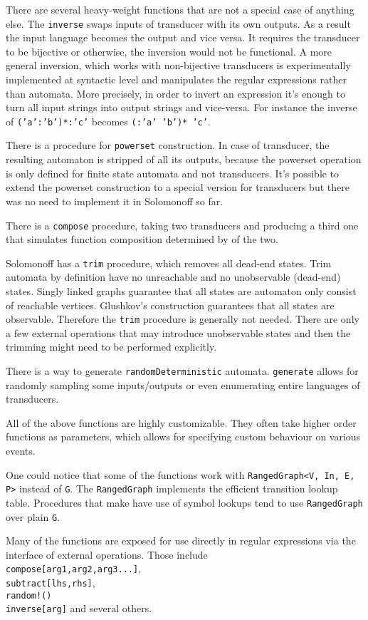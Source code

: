 \documentclass[12pt]{article}
\begin{document}
There are several heavy-weight functions that are not a special case of anything else. The
\texttt{inverse}  swaps inputs of transducer with its own outputs. As a result the input language becomes the output and vice versa. It requires the transducer to be bijective or otherwise, the inversion would not be functional. A more general inversion, which works with non-bijective transducers is experimentally implemented at syntactic level and manipulates the regular expressions rather than automata. More precisely, in order to invert an expression it's enough to turn all input strings into output strings and vice-versa. For instance the inverse of \texttt{('a':'b')*:'c'} becomes \texttt{(:'a' 'b')* 'c'}. 

There is a procedure for \texttt{powerset} construction. In case of transducer, the resulting automaton is stripped of all its outputs, because the powerset operation is only defined for finite state automata and not transducers. It's possible to extend the powerset construction to a special version for transducers but there was no need to implement it in Solomonoff so far. 

There is a \texttt{compose} procedure, taking two transducers and producing a third one that simulates function composition determined by of the two.

Solomonoff has a \texttt{trim} procedure, which removes all dead-end states. Trim automata by definition have no unreachable and no unobservable (dead-end) states. Singly linked graphs guarantee that all states are automaton only consist of reachable vertices. Glushkov's construction guarantees that all states are observable. Therefore the \texttt{trim} procedure is generally not needed. There are only a few external operations that may introduce unobservable states and then the trimming might need to be performed explicitly.

There is a way to generate \texttt{randomDeterministic} automata. \texttt{generate} allows for randomly sampling some inputs/outputs or even enumerating entire languages of transducers.

All of the above functions are highly customizable. They often take higher order functions as parameters, which allows for specifying custom behaviour on various events. 

One could notice that some of the functions work with \texttt{RangedGraph<V, In, E, P>} instead of \texttt{G}. The \texttt{RangedGraph} implements the efficient transition lookup table. Procedures that make have use of symbol lookups tend to use \texttt{RangedGraph} over plain \texttt{G}.  


Many of the functions are exposed for use directly in regular expressions via the interface of external operations. Those include \\
\texttt{compose[arg1,arg2,arg3...]}, \\
\texttt{subtract[lhs,rhs]}, \\
\texttt{random!()} \\
\texttt{inverse[arg]} and several others.



    
\end{document}
